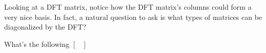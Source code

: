 

Looking at a DFT matrix, notice how the DFT matrix's columns could form a very nice basis.
In fact, a natural question to ask is what types of matrices can be diagonalized by the DFT?

\begin{enumerate}

\qitem
What's the following 
$\begin{bmatrix}


\end{bmatrix}$


\end{enumerate}
